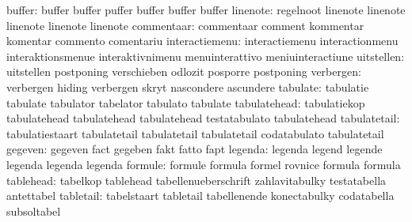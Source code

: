                    buffer: buffer                    buffer
                           puffer                    buffer
                           buffer                    buffer
                 linenote: regelnoot                 linenote 
                           linenote                  linenote
                           linenote                  linenote
               commentaar: commentaar                comment
                           kommentar                 komentar
                           commento                  comentariu
           interactiemenu: interactiemenu            interactionmenu
                           interaktionsmenue         interaktivnimenu
                           menuinterattivo           meniuinteractiune
               uitstellen: uitstellen                postponing
                           verschieben               odlozit
                           posporre                  postponing %
                verbergen: verbergen                 hiding
                           verbergen                 skryt
                           nascondere                ascundere
                 tabulate: tabulatie                 tabulate
                           tabulator                 tabelator
                           tabulato                  tabulate
             tabulatehead: tabulatiekop              tabulatehead
                           tabulatehead              tabulatehead
                           testatabulato             tabulatehead %
             tabulatetail: tabulatiestaart           tabulatetail
                           tabulatetail              tabulatetail
                           codatabulato              tabulatetail %
                  gegeven: gegeven                   fact
                           gegeben                   fakt
                           fatto                     fapt
                  legenda: legenda                   legend
                           legende                   legenda
                           legenda                   legenda
                  formule: formule                   formula
                           formel                    rovnice
                           formula                   formula
                tablehead: tabelkop                  tablehead
                           tabellenueberschrift      zahlavitabulky
                           testatabella              antettabel
                tabletail: tabelstaart               tabletail
                           tabellenende              konectabulky
                           codatabella               subsoltabel
